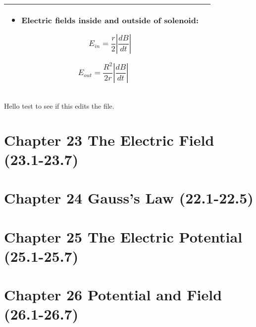 \documentclass{article}
\begin{document}
\begin{center}
\begin{longtable}{|p{9cm}|p{9cm}|}
\begin{itemize}
\begin{itemize}
				      \item Electric fields inside and outside of solenoid:

				            \[E_{in} = \frac{r}{2}\left\lvert \frac{dB}{dt} \right\rvert \]

			      \end{itemize}

			      \[E_{out} = \frac{R^2}{2r}\left\lvert \frac{dB}{dt} \right\rvert \]



		\end{itemize} \\

		\hline

	\end{longtable}



\end{center}




Hello test to see if this edits the file.



\LARGE

\section*{Chapter 23 The Electric Field (23.1-23.7)}






\LARGE

\section*{Chapter 24 Gauss's Law (22.1-22.5)}






\LARGE

\section*{Chapter 25 The Electric Potential (25.1-25.7)}






\LARGE

\section*{Chapter 26 Potential and Field (26.1-26.7)}
\end{document}
